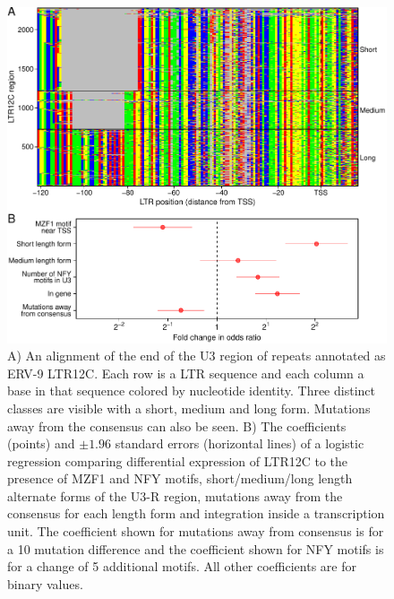 \documentclass[../sherrill-Mix_thesis.tex]{subfiles}
\begin{document}
		\begin{figure}
			\centering
				\includegraphics[width=\textwidth]{ltr12c.pdf}
			\caption[Characteristics of LTR12C sequences associated with induction upon infection of primary T cells with \hivEight{}.]{  A) An alignment of the \threePrime{} end of the U3 region of repeats annotated as ERV-9 LTR12C. Each row is a LTR sequence and each column a base in that sequence colored by nucleotide identity. Three distinct classes are visible with a short, medium and long form. Mutations away from the consensus can also be seen. B)  The coefficients (points) and $\pm 1.96$ standard errors (horizontal lines) of a logistic regression comparing differential expression of LTR12C to the presence of MZF1 and NFY motifs, short/medium/long length alternate forms of the U3-R region, mutations away from the consensus for each length form and integration inside a transcription unit. The coefficient shown for mutations away from consensus is for a 10 mutation difference and the coefficient shown for NFY motifs is for a change of 5 additional motifs. All other coefficients are for binary values.}
			\label{figLtr12c}
		\end{figure}
\end{document}
